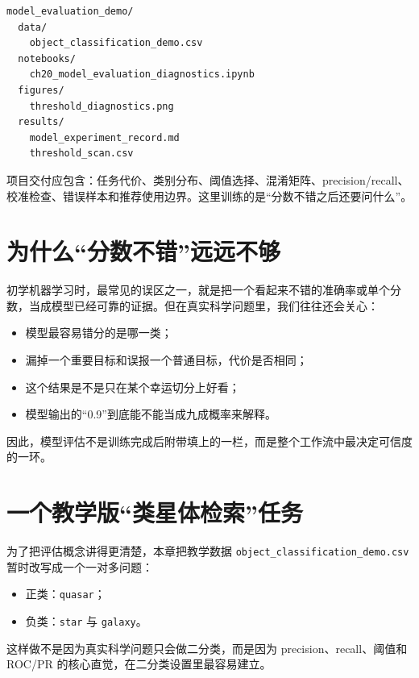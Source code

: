 \begin{examplebox}[最小模型评估项目结构]
\begin{lstlisting}[style=terminal]
model_evaluation_demo/
  data/
    object_classification_demo.csv
  notebooks/
    ch20_model_evaluation_diagnostics.ipynb
  figures/
    threshold_diagnostics.png
  results/
    model_experiment_record.md
    threshold_scan.csv
\end{lstlisting}
\end{examplebox}

项目交付应包含：任务代价、类别分布、阈值选择、混淆矩阵、precision/recall、校准检查、错误样本和推荐使用边界。这里训练的是“分数不错之后还要问什么”。

\section{为什么“分数不错”远远不够}

初学机器学习时，最常见的误区之一，就是把一个看起来不错的准确率或单个分数，当成模型已经可靠的证据。但在真实科学问题里，我们往往还会关心：

\begin{itemize}
    \item 模型最容易错分的是哪一类；
    \item 漏掉一个重要目标和误报一个普通目标，代价是否相同；
    \item 这个结果是不是只在某个幸运切分上好看；
    \item 模型输出的“0.9”到底能不能当成九成概率来解释。
\end{itemize}

因此，模型评估不是训练完成后附带填上的一栏，而是整个工作流中最决定可信度的一环。

\section{一个教学版“类星体检索”任务}

为了把评估概念讲得更清楚，本章把教学数据
\nolinkurl{object_classification_demo.csv}
暂时改写成一个一对多问题：

\begin{itemize}
    \item 正类：\texttt{quasar}；
    \item 负类：\texttt{star} 与 \texttt{galaxy}。
\end{itemize}

这样做不是因为真实科学问题只会做二分类，而是因为 precision、recall、阈值和 ROC/PR 的核心直觉，在二分类设置里最容易建立。

